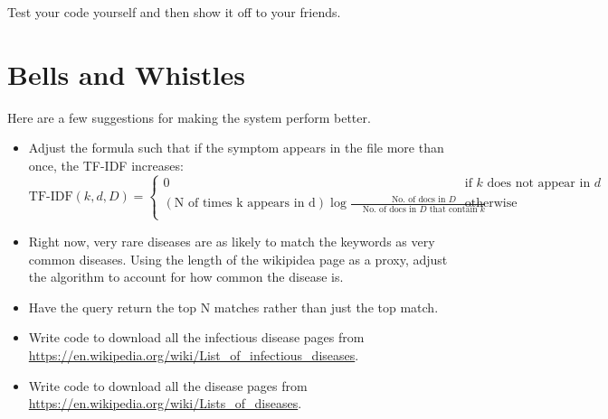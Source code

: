 \documentclass{assignment}
\begin{document}
Test your code yourself and then show it off to your friends. 


\section*{Bells and Whistles}
Here are a few suggestions for making the system perform better.

\begin{itemize}
\item Adjust the formula such that if the symptom appears in the file more than once, the TF-IDF increases:
\[ \text{TF-IDF}(k, d, D) =
  \begin{cases}
    0       & \text{if } k \text{ does not appear in } d \\
    (\text{N of times k appears in d}) \log \frac{ \quad \text{ No. of docs in } D }{ \quad \text{ No. of docs in } D \text{ that contain } k} & \text{otherwise}   \\
    \end{cases}
\]

\item Right now, very rare diseases are as likely to match the keywords as very common diseases. Using the length of the wikipidea page as a proxy, adjust the algorithm to account for how common the disease is.

\item Have the query return the top N matches rather than just the top match.

\item Write code to download all the infectious disease pages from \url{https://en.wikipedia.org/wiki/List_of_infectious_diseases}.

\item Write code to download all the disease pages from \url{https://en.wikipedia.org/wiki/Lists_of_diseases}.

\end{itemize}
\end{document}
